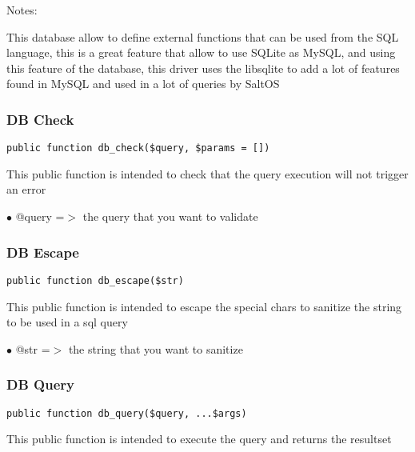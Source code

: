 \documentclass[a4paper]{article}
\begin{document}
Notes:

This database allow to define external functions that can be used from the SQL language,
this is a great feature that allow to use SQLite as MySQL, and using this feature of the
database, this driver uses the libsqlite to add a lot of features found in MySQL and
used in a lot of queries by SaltOS

\hypertarget{toc358}{}
\subsubsection{DB Check}

\begin{lstlisting}
public function db_check($query, $params = [])
\end{lstlisting}

This public function is intended to check that the query execution will not trigger an error

\begin{compactitem}
\item[\color{myblue}$\bullet$] @query =$>$ the query that you want to validate
\end{compactitem}

\hypertarget{toc359}{}
\subsubsection{DB Escape}

\begin{lstlisting}
public function db_escape($str)
\end{lstlisting}

This public function is intended to escape the special chars to sanitize the string to be used
in a sql query

\begin{compactitem}
\item[\color{myblue}$\bullet$] @str =$>$ the string that you want to sanitize
\end{compactitem}

\hypertarget{toc360}{}
\subsubsection{DB Query}

\begin{lstlisting}
public function db_query($query, ...$args)
\end{lstlisting}

This public function is intended to execute the query and returns the resultset
\end{document}
